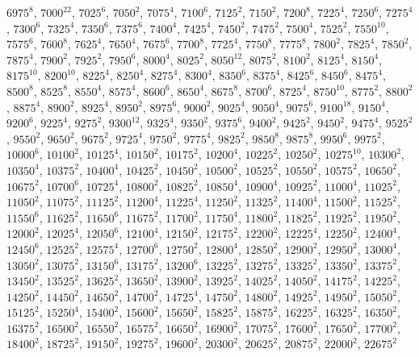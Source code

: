 \begin{itemize}
$6975^{8}$, $7000^{22}$, $7025^{6}$, $7050^{2}$, $7075^{4}$, $7100^{6}$, $7125^{2}$, $7150^{2}$, $7200^{8}$, $7225^{4}$, $7250^{6}$, $7275^{4}$, $7300^{6}$, $7325^{4}$, $7350^{6}$, $7375^{6}$, $7400^{4}$, $7425^{4}$, $7450^{2}$, $7475^{2}$, $7500^{4}$, $7525^{2}$, $7550^{10}$, $7575^{6}$, $7600^{8}$, $7625^{4}$, $7650^{4}$, $7675^{6}$, $7700^{8}$, $7725^{4}$, $7750^{8}$, $7775^{8}$, $7800^{2}$, $7825^{4}$, $7850^{2}$, $7875^{4}$, $7900^{2}$, $7925^{2}$, $7950^{6}$, $8000^{4}$, $8025^{2}$, $8050^{12}$, $8075^{2}$, $8100^{2}$, $8125^{4}$, $8150^{4}$, $8175^{10}$, $8200^{10}$, $8225^{4}$, $8250^{4}$, $8275^{4}$, $8300^{4}$, $8350^{6}$, $8375^{4}$, $8425^{6}$, $8450^{6}$, $8475^{4}$, $8500^{8}$, $8525^{8}$, $8550^{4}$, $8575^{4}$, $8600^{6}$, $8650^{4}$, $8675^{8}$, $8700^{6}$, $8725^{4}$, $8750^{10}$, $8775^{2}$, $8800^{2}$, $8875^{4}$, $8900^{2}$, $8925^{4}$, $8950^{2}$, $8975^{6}$, $9000^{2}$, $9025^{4}$, $9050^{4}$, $9075^{6}$, $9100^{18}$, $9150^{4}$, $9200^{6}$, $9225^{4}$, $9275^{2}$, $9300^{12}$, $9325^{4}$, $9350^{2}$, $9375^{6}$, $9400^{2}$, $9425^{2}$, $9450^{2}$, $9475^{4}$, $9525^{2}$, $9550^{2}$, $9650^{2}$, $9675^{2}$, $9725^{4}$, $9750^{2}$, $9775^{4}$, $9825^{2}$, $9850^{8}$, $9875^{8}$, $9950^{6}$, $9975^{2}$, $10000^{6}$, $10100^{2}$, $10125^{4}$, $10150^{2}$, $10175^{2}$, $10200^{4}$, $10225^{2}$, $10250^{2}$, $10275^{10}$, $10300^{2}$, $10350^{4}$, $10375^{2}$, $10400^{4}$, $10425^{2}$, $10450^{2}$, $10500^{2}$, $10525^{2}$, $10550^{2}$, $10575^{2}$, $10650^{2}$, $10675^{2}$, $10700^{6}$, $10725^{4}$, $10800^{2}$, $10825^{2}$, $10850^{4}$, $10900^{4}$, $10925^{2}$, $11000^{4}$, $11025^{2}$, $11050^{2}$, $11075^{2}$, $11125^{2}$, $11200^{4}$, $11225^{4}$, $11250^{2}$, $11325^{2}$, $11400^{4}$, $11500^{2}$, $11525^{2}$, $11550^{6}$, $11625^{2}$, $11650^{6}$, $11675^{2}$, $11700^{2}$, $11750^{4}$, $11800^{2}$, $11825^{2}$, $11925^{2}$, $11950^{2}$, $12000^{2}$, $12025^{4}$, $12050^{6}$, $12100^{4}$, $12150^{2}$, $12175^{2}$, $12200^{2}$, $12225^{4}$, $12250^{2}$, $12400^{4}$, $12450^{6}$, $12525^{2}$, $12575^{4}$, $12700^{6}$, $12750^{2}$, $12800^{4}$, $12850^{2}$, $12900^{2}$, $12950^{2}$, $13000^{4}$, $13050^{2}$, $13075^{2}$, $13150^{6}$, $13175^{2}$, $13200^{6}$, $13225^{2}$, $13275^{2}$, $13325^{2}$, $13350^{2}$, $13375^{2}$, $13450^{2}$, $13525^{2}$, $13625^{2}$, $13650^{2}$, $13900^{2}$, $13925^{2}$, $14025^{2}$, $14050^{2}$, $14175^{2}$, $14225^{2}$, $14250^{2}$, $14450^{2}$, $14650^{2}$, $14700^{2}$, $14725^{4}$, $14750^{2}$, $14800^{2}$, $14925^{2}$, $14950^{2}$, $15050^{2}$, $15125^{2}$, $15250^{4}$, $15400^{2}$, $15600^{2}$, $15650^{2}$, $15825^{2}$, $15875^{2}$, $16225^{2}$, $16325^{2}$, $16350^{2}$, $16375^{2}$, $16500^{2}$, $16550^{2}$, $16575^{2}$, $16650^{2}$, $16900^{2}$, $17075^{2}$, $17600^{2}$, $17650^{2}$, $17700^{2}$, $18400^{2}$, $18725^{2}$, $19150^{2}$, $19275^{2}$, $19600^{2}$, $20300^{2}$, $20625^{2}$, $20875^{2}$, $22000^{2}$, $22675^{2}$

\end{itemize}
